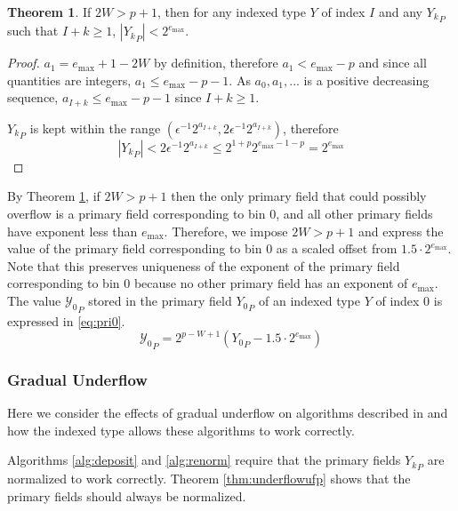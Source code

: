 \documentclass[12pt]{article}
\providecommand{\max}{\ensuremath{\text{max}}}
\theoremstyle{definition}
\newtheorem{thm}{Theorem}[section]
\numberwithin{equation}{section}
\numberwithin{figure}{section}
\begin{document}
      \begin{samepage}
      \begin{thm}
        If $2 W > p + 1$, then for any indexed type $Y$ of index $I$ and any ${Y_k}_P$ such that $I + k \geq 1$, $|{Y_k}_P| < 2^{e_{\max}}$.
        \label{thm:overflow}
      \end{thm}
    \end{samepage}

      \begin{proof}
        $a_1 = e_{\max} + 1 - 2 W$ by definition, therefore $a_1 < e_{\max} - p$ and since all quantities are integers, $a_1 \leq e_{\max} - p - 1$. As $a_0, a_1, ...$ is a positive decreasing sequence, $a_{I + k} \leq e_{\max} - p - 1$ since $I + k \geq 1$.

        ${Y_k}_P$ is kept within the range $(\epsilon^{-1} 2^{a_{I + k}}, 2 \epsilon^{-1} 2^{a_{I + k}})$, therefore
        \begin{equation*}
          |{Y_k}_P| < 2 \epsilon^{-1} 2^{a_{I + k}} \leq 2^{1 + p} 2^{e_{\max} - 1 - p} = 2^{e_{\max}}
        \end{equation*}
      \end{proof}
      By Theorem \ref{thm:overflow}, if $2 W > p + 1$ then the only primary field that could possibly overflow is a primary field corresponding to bin 0, and all other primary fields have exponent less than $e_{\max}$. Therefore, we impose $2 W > p + 1$ and express the value of the primary field corresponding to bin 0 as a scaled offset from $1.5\cdot2^{e_{\max}}$. Note that this preserves uniqueness of the exponent of the primary field corresponding to bin 0 because no other primary field has an exponent of $e_{\max}$. The value ${\mathcal{Y}_0}_P$ stored in the primary field ${Y_0}_P$ of an indexed type $Y$ of index 0 is expressed in \eqref{eq:pri0}.
      \begin{equation}
        {\mathcal{Y}_0}_P = 2^{p - W + 1}({Y_0}_P - 1.5\cdot2^{e_{\max}})
        \label{eq:pri0}
      \end{equation}
    \subsubsection{Gradual Underflow}
      \label{sec:indexed_underflow_gradual}
      Here we consider the effects of gradual underflow on algorithms described in \cite{repsum} and how the indexed type allows these algorithms to work correctly.

      Algorithms \ref{alg:deposit} and \ref{alg:renorm} require that the primary fields ${Y_k}_P$ are normalized to work correctly. Theorem \ref{thm:underflowufp} shows that the primary fields should always be normalized.
\end{document}
